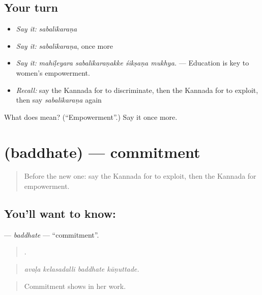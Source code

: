 \subsection*{Your turn}
\begin{itemize}
\raggedright
  \item \emph{Say it:} \emph{sabalīkaraṇa}
  \item \emph{Say it:} \emph{sabalīkaraṇa}, once more
  \item \emph{Say it:} \emph{mahiḷeyara sabalīkaraṇakke śikṣaṇa mukhya.} — Education is key to women's empowerment.
  \item \emph{Recall:} say the Kannada for to discriminate, then the Kannada for to exploit, then say \emph{sabalīkaraṇa} again
\end{itemize}

\begin{tcolorbox}[breakable,colback=teal!4,colframe=teal!35!black,title={Before you move on}]
What does  mean? (\textquotedblleft{}Empowerment\textquotedblright{}.) Say it once more.
\end{tcolorbox}
\section[\texorpdfstring{\kn{ಬದ್ಧತೆ} (baddhate)}{ಬದ್ಧತೆ (baddhate)}]{ (baddhate) — commitment}

\label{lesson:KA-C391-baddhate}



\begin{quote}
Before the new one: say the Kannada for to exploit, then the Kannada for empowerment.
\end{quote}

\subsection*{You'll want to know: }
\textbf{} — \emph{baddhate} — \textquotedblleft{}commitment\textquotedblright{}.

\begin{quote}
   .
\end{quote}

\begin{quote}
\emph{avaḷa kelasadalli baddhate kāṇuttade.}
\end{quote}

\begin{quote}
Commitment shows in her work.
\end{quote}

